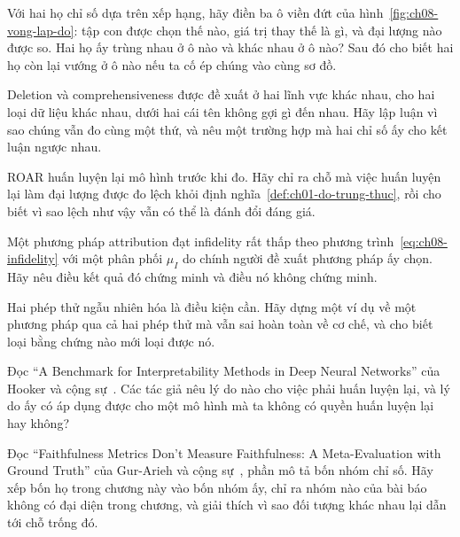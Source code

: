 \cauhoi
\begin{cauhoids}
  \item Với hai họ chỉ số dựa trên xếp hạng, hãy điền ba ô viền đứt của
  hình~\ref{fig:ch08-vong-lap-do}: tập con được chọn thế nào, giá trị thay thế
  là gì, và đại lượng nào được so. Hai họ ấy trùng nhau ở ô nào và khác nhau ở ô
  nào? Sau đó cho biết hai họ còn lại vướng ở ô nào nếu ta cố ép chúng vào cùng
  sơ đồ.
  \item Deletion và comprehensiveness được đề xuất ở hai lĩnh vực khác nhau, cho
  hai loại dữ liệu khác nhau, dưới hai cái tên không gợi gì đến nhau. Hãy lập
  luận vì sao chúng vẫn đo cùng một thứ, và nêu một trường hợp mà hai chỉ số ấy
  cho kết luận ngược nhau.
  \item ROAR huấn luyện lại mô hình trước khi đo. Hãy chỉ ra chỗ mà việc huấn
  luyện lại làm đại lượng được đo lệch khỏi
  định nghĩa~\ref{def:ch01-do-trung-thuc}, rồi cho biết vì sao lệch như vậy vẫn
  có thể là đánh đổi đáng giá.
  \item Một phương pháp attribution đạt infidelity rất thấp theo
  phương trình~\ref{eq:ch08-infidelity} với một phân phối $\mu_I$ do chính người
  đề xuất phương pháp ấy chọn. Hãy nêu điều kết quả đó chứng minh và điều nó
  không chứng minh.
  \item Hai phép thử ngẫu nhiên hóa là điều kiện cần. Hãy dựng một ví dụ về một
  phương pháp qua cả hai phép thử mà vẫn sai hoàn toàn về cơ chế, và cho biết
  loại bằng chứng nào mới loại được nó.
  \item Đọc \enquote{A Benchmark for Interpretability Methods in Deep Neural
  Networks} của Hooker và cộng sự~\autocite{mroar}. Các tác giả nêu lý do nào
  cho việc phải huấn luyện lại, và lý do ấy có áp dụng được cho một mô hình mà
  ta không có quyền huấn luyện lại hay không?
  \item Đọc \enquote{Faithfulness Metrics Don't Measure Faithfulness: A
  Meta-Evaluation with Ground Truth} của Gur-Arieh và cộng
  sự~\autocite{p21metrics}, phần mô tả bốn nhóm chỉ số. Hãy xếp bốn họ trong
  chương này vào bốn nhóm ấy, chỉ ra nhóm nào của bài báo không có đại diện
  trong chương, và giải thích vì sao đối tượng khác nhau lại dẫn tới chỗ trống
  đó.
\end{cauhoids}
